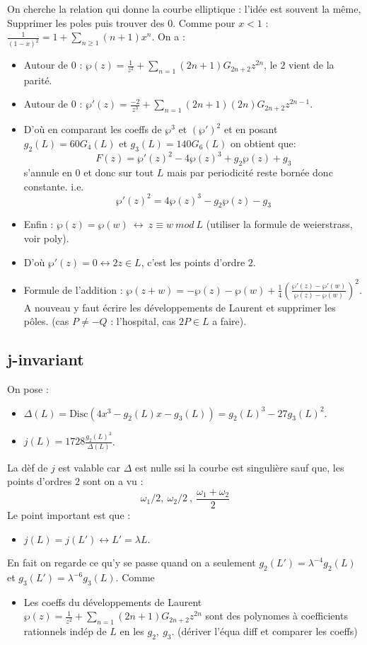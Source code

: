 \documentclass[12pt]{article}
\newcommand{\w}{\omega}
\begin{document}
On cherche la relation qui donne la courbe elliptique : l'idée est souvent la même, 
Supprimer les poles puis trouver des 0. Comme pour $x<1$ : $\frac{1}{(1-x)^2}=1+\sum_{n\geq1} (n+1)x^n$. On a :
\begin{itemize}
    \item Autour de $0$ : $\wp(z)=\frac{1}{z^2} + \sum_{n=1} (2n+1)G_{2n+2}z^{2n}$, le $2$ vient de la parité.
    \item Autour de $0$ : $\wp '(z)=\frac{-2}{z^3} + \sum_{n=1}(2n+1)(2n)G_{2n+2}z^{2n-1}$.
    \item D'où en comparant les coeffs de $\wp^3$ et $(\wp ')^2$ et en posant $g_2(L)=60G_4(L)$ et $g_3(L)=140G_6(L)$ on obtient que:
    $$F(z)=\wp '(z)^2-4\wp(z)^3+g_2\wp(z)+g_3$$
s'annule en $0$ et donc sur tout $L$ mais par periodicité reste bornée donc constante. i.e. $$\wp '(z)^2=4\wp(z)^3-g_2\wp(z)-g_3$$
    \item Enfin : $\wp(z)=\wp(w)~\leftrightarrow~z\equiv w~mod~L$ (utiliser la formule de weierstrass, voir poly).
    \item D'où $\wp '(z)=0\leftrightarrow 2z\in L$, c'est les points d'ordre $2$.
    \item Formule de l'addition : $\wp(z+w)=-\wp(z)-\wp(w)+\frac{1}{4}(\frac{\wp '(z)-\wp '(w)}{\wp(z)-\wp(w)})^2$. A nouveau y faut écrire les
    développements de Laurent et supprimer les pôles. (cas $P\ne-Q$ : l'hospital, cas $2P\in L$ a faire).  
\end{itemize}

\subsection{j-invariant}
On pose :
\begin{itemize}
    \item $\Delta(L)=\textrm{Disc}(4x^3-g_2(L)x-g_3(L))=g_2(L)^3-27g_3(L)^2$.
    \item $j(L)=1728\frac{g_2(L)^3}{\Delta(L)}$.
\end{itemize}

La dèf de $j$ est valable car $\Delta$ est nulle ssi la courbe est singulière sauf que, les points d'ordres $2$ sont on a vu :$$\w_1/2,~\w_2/2~,~\frac{\w_1+\w_2}{2}$$
Le point important est que :\begin{itemize}
    \item $j(L)=j(L')\leftrightarrow L'=\lambda L$.
\end{itemize}

En fait on regarde ce qu'y se passe quand on a seulement $g_2(L')=\lambda^{-4}g_2(L)$ et $g_3(L')=\lambda^{-6}g_3(L)$. Comme 
\begin{itemize}
    \item Les coeffs du développements de Laurent $\wp(z)=\frac{1}{z^2} + \sum_{n=1} (2n+1)G_{2n+2}z^{2n}$ sont des polynomes
    à coefficients rationnels indép de $L$ en les $g_2,~g_3$. (dériver l'équa diff et comparer les coeffs)
\end{itemize}
\end{document}
